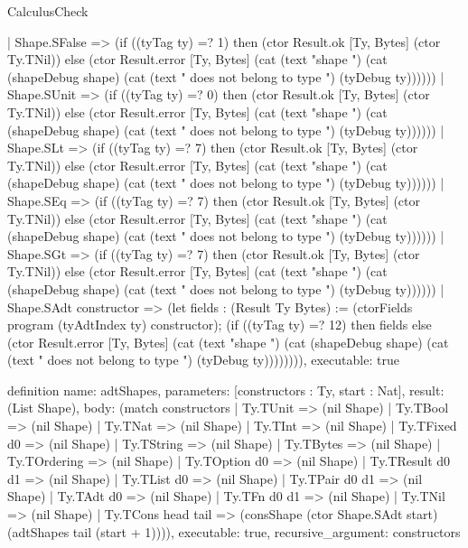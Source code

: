 \begin{lexlean}{CalculusCheck}
\begin{semanticmodule}
{    | Shape.SFalse => (if ((tyTag ty) =? 1) then (ctor Result.ok [Ty, Bytes] (ctor Ty.TNil)) else (ctor Result.error [Ty, Bytes] (cat (text "shape ") (cat (shapeDebug shape) (cat (text " does not belong to type ") (tyDebug ty))))))
    | Shape.SUnit => (if ((tyTag ty) =? 0) then (ctor Result.ok [Ty, Bytes] (ctor Ty.TNil)) else (ctor Result.error [Ty, Bytes] (cat (text "shape ") (cat (shapeDebug shape) (cat (text " does not belong to type ") (tyDebug ty))))))
    | Shape.SLt => (if ((tyTag ty) =? 7) then (ctor Result.ok [Ty, Bytes] (ctor Ty.TNil)) else (ctor Result.error [Ty, Bytes] (cat (text "shape ") (cat (shapeDebug shape) (cat (text " does not belong to type ") (tyDebug ty))))))
    | Shape.SEq => (if ((tyTag ty) =? 7) then (ctor Result.ok [Ty, Bytes] (ctor Ty.TNil)) else (ctor Result.error [Ty, Bytes] (cat (text "shape ") (cat (shapeDebug shape) (cat (text " does not belong to type ") (tyDebug ty))))))
    | Shape.SGt => (if ((tyTag ty) =? 7) then (ctor Result.ok [Ty, Bytes] (ctor Ty.TNil)) else (ctor Result.error [Ty, Bytes] (cat (text "shape ") (cat (shapeDebug shape) (cat (text " does not belong to type ") (tyDebug ty))))))
    | Shape.SAdt constructor => (let fields : (Result Ty Bytes) := (ctorFields program (tyAdtIndex ty) constructor); (if ((tyTag ty) =? 12) then fields else (ctor Result.error [Ty, Bytes] (cat (text "shape ") (cat (shapeDebug shape) (cat (text " does not belong to type ") (tyDebug ty)))))))),
  executable: true
}

definition{
  name: adtShapes,
  parameters: [constructors : Ty, start : Nat],
  result: (List Shape),
  body: (match constructors
    | Ty.TUnit => (nil Shape)
    | Ty.TBool => (nil Shape)
    | Ty.TNat => (nil Shape)
    | Ty.TInt => (nil Shape)
    | Ty.TFixed d0 => (nil Shape)
    | Ty.TString => (nil Shape)
    | Ty.TBytes => (nil Shape)
    | Ty.TOrdering => (nil Shape)
    | Ty.TOption d0 => (nil Shape)
    | Ty.TResult d0 d1 => (nil Shape)
    | Ty.TList d0 => (nil Shape)
    | Ty.TPair d0 d1 => (nil Shape)
    | Ty.TAdt d0 => (nil Shape)
    | Ty.TFn d0 d1 => (nil Shape)
    | Ty.TNil => (nil Shape)
    | Ty.TCons head tail => (consShape (ctor Shape.SAdt start) (adtShapes tail (start + 1)))),
  executable: true,
  recursive_argument: constructors
}


\end{semanticmodule}
\end{lexlean}
